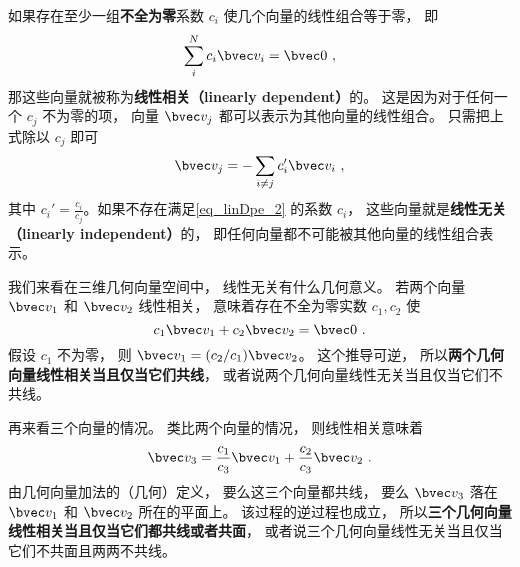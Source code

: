 
\begin{issues}
\issueDraft
\end{issues}


% 

\begin{definition}{}

\end{definition}


如果存在至少一组\textbf{不全为零}系数 $c_i$ 使几个向量的线性组合等于零， 即
\begin{equation}\label{eq_linDpe_2}
\sum_i^N c_i \bvec v_i = \bvec 0~,
\end{equation}
那这些向量就被称为\textbf{线性相关（linearly dependent）}的。 这是因为对于任何一个 $c_j$ 不为零的项， 向量 $\bvec v_j$ 都可以表示为其他向量的线性组合。 只需把上式除以 $c_j$ 即可
\begin{equation}\label{eq_linDpe_3}
\bvec v_j = -\sum_{i \ne j} c_i' \bvec v_i~,
\end{equation}
其中 $c_i' = \frac{c_i}{c_j}$。如果不存在满足\autoref{eq_linDpe_2} 的系数 $c_i$， 这些向量就是\textbf{线性无关（linearly independent）}的， 即任何向量都不可能被其他向量的线性组合表示。

\begin{example}{ }\label{ex_linDpe_1}
我们来看在三维几何向量空间中， 线性无关有什么几何意义。 若两个向量 $\bvec v_1$ 和 $\bvec v_2$ 线性相关， 意味着存在不全为零实数 $c_1, c_2$ 使
\begin{equation}
c_1 \bvec v_1 + c_2 \bvec v_2 = \bvec 0~.
\end{equation}
假设 $c_1$ 不为零， 则 $\bvec v_1 = (c_2 / c_1) \bvec v_2$。 这个推导可逆， 所以\textbf{两个几何向量线性相关当且仅当它们共线}， 或者说两个几何向量线性无关当且仅当它们不共线。

再来看三个向量的情况。 类比两个向量的情况， 则线性相关意味着
\begin{equation}
\bvec v_3 = \frac{c_1}{c_3} \bvec v_1 +  \frac{c_2}{c_3} \bvec v_2~.
\end{equation}
由几何向量加法的（几何）定义， 要么这三个向量都共线， 要么 $\bvec v_3$ 落在 $\bvec v_1$ 和 $\bvec v_2$ 所在的平面上。 该过程的逆过程也成立， 所以\textbf{三个几何向量线性相关当且仅当它们都共线或者共面}， 或者说三个几何向量线性无关当且仅当它们不共面且两两不共线。
\end{example}

